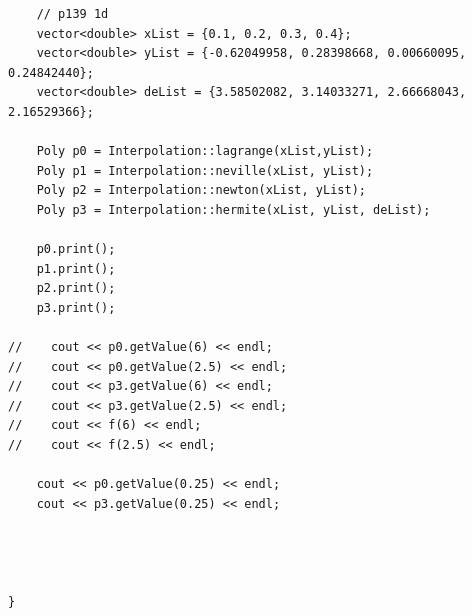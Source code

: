 \documentclass[12pt]{article}
\begin{document}
\begin{lstlisting}
    // p139 1d
    vector<double> xList = {0.1, 0.2, 0.3, 0.4};
    vector<double> yList = {-0.62049958, 0.28398668, 0.00660095, 0.24842440};
    vector<double> deList = {3.58502082, 3.14033271, 2.66668043, 2.16529366};

    Poly p0 = Interpolation::lagrange(xList,yList);
    Poly p1 = Interpolation::neville(xList, yList);
    Poly p2 = Interpolation::newton(xList, yList);
    Poly p3 = Interpolation::hermite(xList, yList, deList);

    p0.print();
    p1.print();
    p2.print();
    p3.print();

//    cout << p0.getValue(6) << endl;
//    cout << p0.getValue(2.5) << endl;
//    cout << p3.getValue(6) << endl;
//    cout << p3.getValue(2.5) << endl;
//    cout << f(6) << endl;
//    cout << f(2.5) << endl;

    cout << p0.getValue(0.25) << endl;
    cout << p3.getValue(0.25) << endl;




}
\end{lstlisting}
\end{document}
